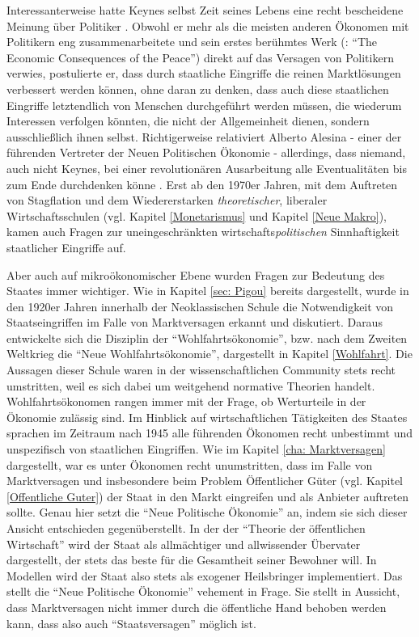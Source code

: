 Interessanterweise hatte Keynes selbst Zeit seines Lebens eine recht bescheidene Meinung über Politiker \parencite[S. 519]{Snowdon2005}. Obwohl er mehr als die meisten anderen Ökonomen mit Politikern eng zusammenarbeitete und sein erstes berühmtes Werk (\textcite{Keynes1919}: "`The Economic Consequences of the Peace"') direkt auf das Versagen von Politikern verwies, postulierte er, dass durch staatliche Eingriffe die reinen Marktlösungen verbessert werden können, ohne daran zu denken, dass auch diese staatlichen Eingriffe letztendlich von Menschen durchgeführt werden müssen, die wiederum Interessen verfolgen könnten, die nicht der Allgemeinheit dienen, sondern ausschließlich ihnen selbst. Richtigerweise relativiert Alberto Alesina - einer der führenden Vertreter der Neuen Politischen Ökonomie - allerdings, dass niemand, auch nicht Keynes, bei einer revolutionären Ausarbeitung alle Eventualitäten bis zum Ende durchdenken könne \parencite[S. 569]{Snowdon2005}. Erst ab den 1970er Jahren, mit dem Auftreten von Stagflation und dem Wiedererstarken \textit{theoretischer}, liberaler Wirtschaftsschulen (vgl. Kapitel \ref{Monetarismus} und Kapitel \ref{Neue Makro}), kamen auch Fragen zur uneingeschränkten wirtschafts\textit{politischen} Sinnhaftigkeit staatlicher Eingriffe auf. 

Aber auch auf mikroökonomischer Ebene wurden Fragen zur Bedeutung des Staates immer wichtiger. Wie in Kapitel \ref{sec: Pigou} bereits dargestellt, wurde in den 1920er Jahren innerhalb der Neoklassischen Schule die Notwendigkeit von Staatseingriffen im Falle von Marktversagen erkannt und diskutiert. Daraus entwickelte sich die Disziplin der "`Wohlfahrtsökonomie"', bzw. nach dem Zweiten Weltkrieg die "`Neue Wohlfahrtsökonomie"', dargestellt in Kapitel \ref{Wohlfahrt}. Die Aussagen dieser Schule waren in der wissenschaftlichen Community stets recht umstritten, weil es sich dabei um weitgehend normative Theorien handelt. Wohlfahrtsökonomen rangen immer mit der Frage, ob Werturteile in der Ökonomie zulässig sind. Im Hinblick auf wirtschaftlichen Tätigkeiten des Staates sprachen im Zeitraum nach 1945 alle führenden Ökonomen recht unbestimmt und unspezifisch von staatlichen Eingriffen. Wie im Kapitel \ref{cha: Marktversagen} dargestellt, war es unter Ökonomen recht unumstritten, dass im Falle von Marktversagen und insbesondere beim Problem Öffentlicher Güter (vgl. Kapitel \ref{Offentliche Guter}) der Staat in den Markt eingreifen und als Anbieter auftreten sollte. Genau hier setzt die "`Neue Politische Ökonomie"' an, indem sie sich dieser Ansicht entschieden gegenüberstellt. In der der "`Theorie der öffentlichen Wirtschaft"' wird der Staat als allmächtiger und allwissender Übervater dargestellt, der stets das beste für die Gesamtheit seiner Bewohner will. In Modellen wird der Staat also stets als exogener Heilsbringer implementiert. Das stellt die "`Neue Politische Ökonomie"' vehement in Frage. Sie stellt in Aussicht, dass Marktversagen nicht immer durch die öffentliche Hand behoben werden kann, dass also auch "`Staatsversagen"' möglich ist.

